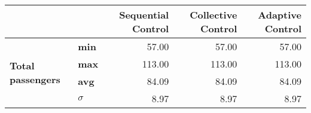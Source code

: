 \begingroup
\renewcommand*{\arraystretch}{1.0}
\begin{table}[]
\centering
\begin{tabular}{llrrr}
                                      &     & \begin{minipage}{2cm}\textbf{Sequential Control} \vspace{1em}\end{minipage} & \begin{minipage}{2cm}\textbf{Collective Control} \vspace{1em}\end{minipage} & \begin{minipage}{2cm}\textbf{Adaptive Control} \vspace{1em}\end{minipage}\\ \hline
\multirow{4}{*}{\textbf{Total passengers}}     & \textbf{min}        & 57.00                                                                                                                                             & 57.00                                                                                                                                             & 57.00                                                                                                                                           \\
                                               & \textbf{max}        & 113.00                                                                                                                                            & 113.00                                                                                                                                            & 113.00                                                                                                                                          \\
                                               & \textbf{avg}        & 84.09                                                                                                                                             & 84.09                                                                                                                                             & 84.09                                                                                                                                           \\
                                               & \textbf{$ \sigma $} & 8.97                                                                                                                                              & 8.97                                                                                                                                              & 8.97                                                                                                                                            \\ \hline

\end{tabular}
\end{table}
